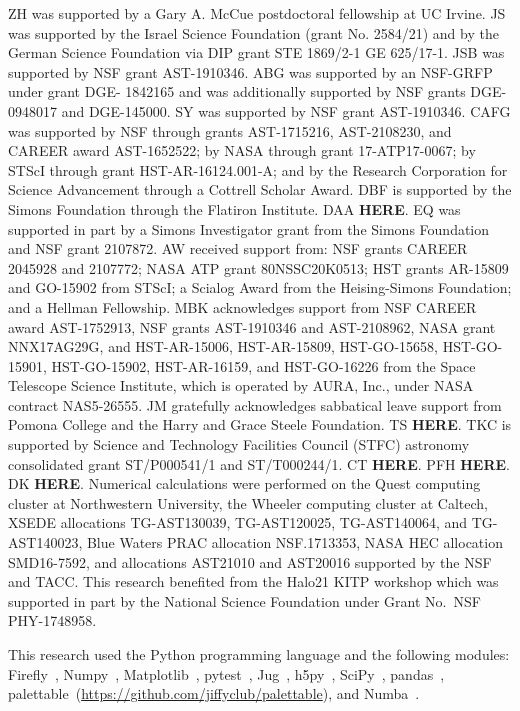 \documentclass[fleqn,usenatbib]{mnras}
\begin{document}
ZH was supported by a Gary A. McCue postdoctoral fellowship at UC Irvine.
JS was supported by the Israel Science Foundation (grant No. 2584/21) and by the German Science Foundation via DIP grant STE 1869/2-1 GE 625/17-1. 
JSB was supported by NSF grant AST-1910346.
ABG was supported by an NSF-GRFP under grant DGE-
1842165 and was additionally supported by NSF grants
DGE-0948017 and DGE-145000.
SY was supported by NSF grant AST-1910346.
CAFG was supported by NSF through grants AST-1715216, AST-2108230,  and CAREER award AST-1652522; by NASA through grant 17-ATP17-0067; by STScI through grant HST-AR-16124.001-A; and by the Research Corporation for Science Advancement through a Cottrell Scholar Award.
DBF is supported by the Simons Foundation through the Flatiron Institute.
DAA \textbf{HERE}.
EQ was supported in part by a Simons Investigator grant from the Simons Foundation and NSF grant 2107872.
AW received support from: NSF grants CAREER 2045928 and 2107772; NASA ATP grant 80NSSC20K0513; HST grants AR-15809 and GO-15902 from STScI; a Scialog Award from the Heising-Simons Foundation; and a Hellman Fellowship.
MBK acknowledges support from NSF CAREER award AST-1752913, NSF grants AST-1910346 and AST-2108962, NASA grant NNX17AG29G, and HST-AR-15006, HST-AR-15809, HST-GO-15658, HST-GO-15901, HST-GO-15902, HST-AR-16159, and HST-GO-16226 from the Space Telescope Science Institute, which is operated by AURA, Inc., under NASA contract NAS5-26555.
JM gratefully acknowledges sabbatical leave support from Pomona College and the Harry and Grace Steele Foundation.
TS \textbf{HERE}.
TKC is supported by Science and Technology Facilities Council (STFC) astronomy
consolidated grant ST/P000541/1 and ST/T000244/1.
CT \textbf{HERE}.
PFH \textbf{HERE}.
DK \textbf{HERE}.
Numerical calculations were performed on the Quest computing cluster at Northwestern University, the Wheeler computing cluster at Caltech, XSEDE allocations TG-AST130039, TG-AST120025, TG-AST140064, and TG-AST140023, Blue Waters PRAC allocation NSF.1713353, NASA HEC allocation SMD16-7592, and allocations AST21010 and AST20016 supported by the NSF and TACC.
This research benefited from the Halo21 KITP workshop which was supported in part by the National Science Foundation under Grant No.~NSF PHY-1748958.

This research used the Python programming language and the following modules:
Firefly~\citep{Geller2018},
Numpy~\citep{Harris2020},
Matplotlib~\citep{Hunter2007},
pytest~\citep{pytest3.4},
Jug~\citep{Coelho2017},
h5py~\citep{h5py},
SciPy~\citep{Virtanen2020},
pandas~\citep{McKinney2010,Reback2020},
palettable~(\url{https://github.com/jiffyclub/palettable}),
and Numba~\citep{Lam2015}.
\end{document}
